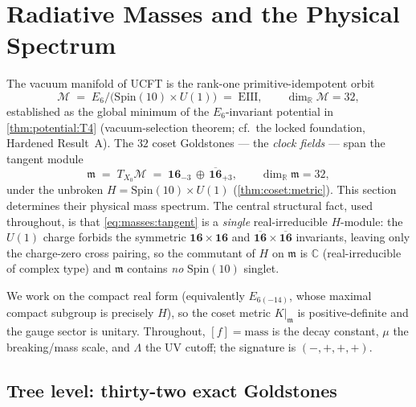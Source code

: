 \section{Radiative Masses and the Physical Spectrum}
\label{sec:masses:main}

The vacuum manifold of UCFT is the rank-one primitive-idempotent orbit
\[
  \mathcal{M} \;=\; E_{6}/\bigl(\mathrm{Spin}(10)\times U(1)\bigr) \;=\; \mathrm{EIII},
  \qquad \dim_{\mathbb R}\mathcal{M} = 32,
\]
established as the global minimum of the $E_{6}$-invariant potential in
\autoref{thm:potential:T4} (vacuum-selection theorem; cf.\ the locked
foundation, Hardened Result~A). The $32$ coset Goldstones --- the
\emph{clock fields} --- span the tangent module
\begin{equation}\label{eq:masses:tangent}
  \mathfrak m \;=\; T_{X_{0}}\mathcal{M}
  \;=\; \mathbf{16}_{-3}\,\oplus\,\overline{\mathbf{16}}_{+3},
  \qquad \dim_{\mathbb R}\mathfrak m = 32,
\end{equation}
under the unbroken $H=\mathrm{Spin}(10)\times U(1)$ (\autoref{thm:coset:metric}).
This section determines their physical mass spectrum. The central structural
fact, used throughout, is that \eqref{eq:masses:tangent} is a \emph{single}
real-irreducible $H$-module: the $U(1)$ charge forbids the symmetric
$\mathbf{16}\times\mathbf{16}$ and $\overline{\mathbf{16}}\times\overline{\mathbf{16}}$
invariants, leaving only the charge-zero cross pairing, so the commutant of
$H$ on $\mathfrak m$ is $\mathbb C$ (real-irreducible of complex type) and
$\mathfrak m$ contains \emph{no} $\mathrm{Spin}(10)$ singlet.

We work on the compact real form (equivalently $E_{6(-14)}$, whose maximal
compact subgroup is precisely $H$), so the coset metric $K|_{\mathfrak m}$ is
positive-definite and the gauge sector is unitary. Throughout, $[f]=\text{mass}$
is the decay constant, $\mu$ the breaking/mass scale, and $\Lambda$ the UV
cutoff; the signature is $(-,+,+,+)$.

\subsection{Tree level: thirty-two exact Goldstones}
\label{sec:masses:tree}

